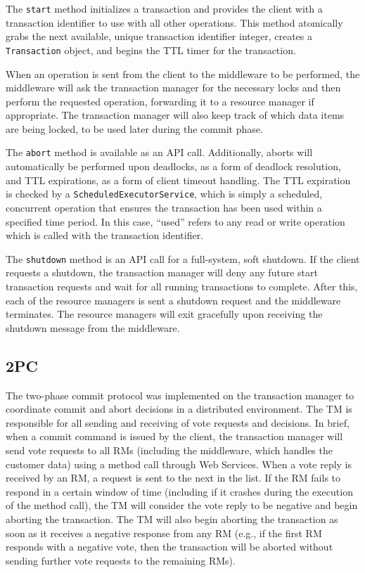 \documentclass[11pt]{article}
\begin{document}
The \texttt{start} method initializes a transaction and provides the client with a transaction identifier to use with all other operations. This method atomically grabs the next available, unique transaction identifier integer, creates a \texttt{Transaction} object, and begins the TTL timer for the transaction. \par

When an operation is sent from the client to the middleware to be performed, the middleware will ask the transaction manager for the necessary locks and then perform the requested operation, forwarding it to a resource manager if appropriate. The transaction manager will also keep track of which data items are being locked, to be used later during the commit phase.

The \texttt{abort} method is available as an API call. Additionally, aborts will automatically be performed upon deadlocks, as a form of deadlock resolution, and TTL expirations, as a form of client timeout handling. The TTL expiration is checked by a \texttt{ScheduledExecutorService}, which is simply a scheduled, concurrent operation that ensures the transaction has been used within a specified time period. In this case, ``used'' refers to any read or write operation which is called with the transaction identifier.  \par

The \texttt{shutdown} method is an API call for a full-system, soft shutdown. If the client requests a shutdown, the transaction manager will deny any future start transaction requests and wait for all running transactions to complete. After this, each of the resource managers is sent a shutdown request and the middleware terminates. The resource managers will exit gracefully upon receiving the shutdown message from the middleware. \par

\subsection*{2PC}

The two-phase commit protocol was implemented on the transaction manager to coordinate commit and abort decisions in a distributed environment. The TM is responsible for all sending and receiving of vote requests and decisions. In brief, when a commit command is issued by the client, the transaction manager will send vote requests to all RMs (including the middleware, which handles the customer data) using a method call through Web Services. When a vote reply is received by an RM, a request is sent to the next in the list. If the RM fails to respond in a certain window of time (including if it crashes during the execution of the method call), the TM will consider the vote reply to be negative and begin aborting the transaction. The TM will also begin aborting the transaction as soon as it receives a negative response from any RM (e.g., if the first RM responds with a negative vote, then the transaction will be aborted without sending further vote requests to the remaining RMs).  \par
\end{document}
